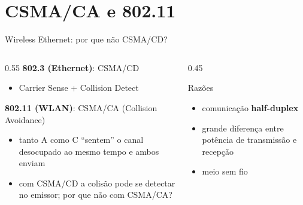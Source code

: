 \documentclass[aspectratio=169,11pt]{beamer}
\begin{document}
\section{CSMA/CA e 802.11}

\begin{frame}{Wireless Ethernet: por que não CSMA/CD?}
  \begin{columns}
    \begin{column}{0.55\textwidth}
      \textbf{802.3 (Ethernet)}: CSMA/CD
      \begin{itemize}
        \item Carrier Sense + Collision Detect
      \end{itemize}
      \textbf{802.11 (WLAN)}: CSMA/CA (Collision Avoidance)
      \begin{itemize}
        \item tanto A como C ``sentem'' o canal desocupado ao mesmo tempo e ambos enviam
        \item com CSMA/CD a colisão pode se detectar no emissor; \alert{por que não com CSMA/CA?}
      \end{itemize}
    \end{column}
    \begin{column}{0.45\textwidth}
      \begin{block}{Razões}
        \begin{itemize}
          \item comunicação \textbf{half-duplex}
          \item grande diferença entre potência de transmissão e recepção
          \item meio sem fio
        \end{itemize}
      \end{block}
      \begin{center}
      \end{center}
    \end{column}
  \end{columns}
\end{frame}
\end{document}
